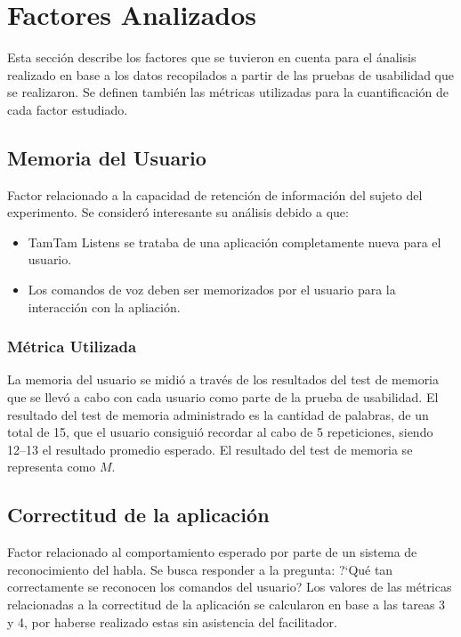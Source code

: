 \section{Factores Analizados}
\label{sec:factores}

Esta secci\'on describe los factores que se tuvieron en cuenta para el \'analisis realizado
en base a los datos recopilados a partir de las pruebas de usabilidad que se realizaron.
Se definen tambi\'en las m\'etricas utilizadas para la cuantificaci\'on de cada factor estudiado.

\subsection{Memoria del Usuario}
Factor relacionado a la capacidad de retenci\'on de informaci\'on del sujeto del experimento.
Se consider\'o interesante su an\'alisis debido a que:
\begin{itemize}
	\item TamTam Listens se trataba de una aplicaci\'on completamente nueva para el usuario.
	\item Los comandos de voz deben ser memorizados por el usuario para la interacci\'on con
	la apliaci\'on.
\end{itemize}
\subsubsection{M\'etrica Utilizada}
La memoria del usuario se midi\'o a trav\'es de los resultados del test de memoria que se llev\'o
a cabo con cada usuario como parte de la prueba de usabilidad.
El resultado del test de memoria administrado es la cantidad de palabras, de un total de 15,
que el usuario consigui\'o recordar al cabo de 5 repeticiones, siendo 12--13 el resultado promedio
esperado. El resultado del test de memoria se representa como $M$.

\subsection{Correctitud de la aplicaci\'on}
Factor relacionado al comportamiento esperado por parte de un sistema de reconocimiento del
habla. Se busca responder a la pregunta: {?`}Qu\'e tan correctamente se reconocen los comandos 
del usuario?
Los valores de las m\'etricas relacionadas a la correctitud de la aplicaci\'on se calcularon
en base a las tareas 3 y 4, por haberse realizado estas sin asistencia del facilitador.  
